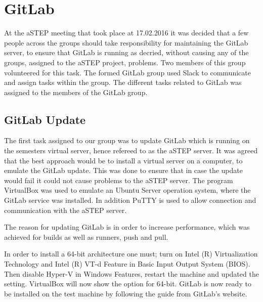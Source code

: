 \section{GitLab}
At the aSTEP meeting that took place at 17.02.2016 it was decided that a few people across the groups should take responsibility for maintaining the GitLab server, to ensure that GitLab is running as decried, without causing any of the groups, assigned to the aSTEP project, problems. Two members of this group volunteered for this task. 
The formed GitLab group used Slack to communicate and assign tasks within the group. The different tasks related to GitLab was assigned to the members of the GitLab group.

\subsection{GitLab Update}
The first task assigned to our group was to update GitLab which is running on the semesters virtual server, hence refereed to as the aSTEP server. It was agreed that the best approach would be to install a virtual server on a computer, to emulate the GitLab update. This was done to ensure that in case the update would fail it could not cause problems to the aSTEP server.
The program VirtualBox\cite{vbox} was used to emulate an Ubuntu Server operation system, where the GitLab service was installed. In addition PuTTY\cite{putty} is used to allow connection and communication with the aSTEP server.

The reason for updating GitLab is in order to increase performance, which was achieved for builds as well as runners, push and pull. 

In order to install a 64-bit architecture one must; turn on Intel (R) Virtualization Technology and Intel (R) VT-d Feature in Basic Input Output System (BIOS). Then disable Hyper-V in Windows Features, restart the machine and updated the setting. VirtualBox will now show the option for 64-bit. 
GitLab is now ready to be installed on the test machine by following the guide from GitLab's website\cite{gitlab_guide}.


